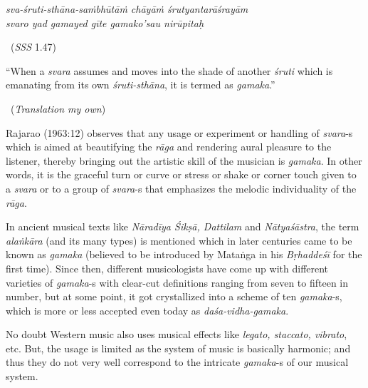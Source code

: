 \begin{myquote}
\textit{sva-śruti-sthāna-saṁbhūtāṁ chāyāṁ śrutyantarāśrayām }\\ \textit{svaro yad gamayed gīte gamako’sau nirūpitaḥ } 

~\hfill (\textit{SSS} 1.47)
\end{myquote}

\begin{myquote}
“When a \textit{svara} assumes and moves into the shade of another \textit{śruti} which is emanating from its own \textit{śruti-sthāna}, it is termed as \textit{gamaka}.” 

~\hfill (\textit{Translation my own})
\end{myquote}

Rajarao (1963:12) observes that any usage or experiment or handling of \textit{svara}-s which is aimed at beautifying the \textit{rāga} and rendering aural pleasure to the listener, thereby bringing out the artistic skill of the musician is \textit{gamaka}. In other words, it is the graceful turn or curve or stress or shake or corner touch given to a \textit{svara} or to a group of \textit{svara}-s that emphasizes the melodic individuality of the \textit{rāga}.

In ancient musical texts like \textit{Nāradīya Śikṣā, Dattilam} and \textit{Nātyaśāstra}, the term \textit{alaṅkāra} (and its many types) is mentioned which in later centuries came to be known as \textit{gamaka} (believed to be introduced by Mataṅga in his \textit{Bṛhaddeśī} for the first time). Since then, different musicologists have come up with different varieties of \textit{gamaka}-s with clear-cut definitions ranging from seven to fifteen in number, but at some point, it got crystallized into a scheme of ten \textit{gamaka}-s, which is more or less accepted even today as \textit{daśa-vidha-gamaka}.

No doubt Western music also uses musical effects like \textit{legato, staccato, vibrato}, etc. But, the usage is limited as the system of music is basically harmonic; and thus they do not very well correspond to the intricate \textit{gamaka}-s of our musical system.


